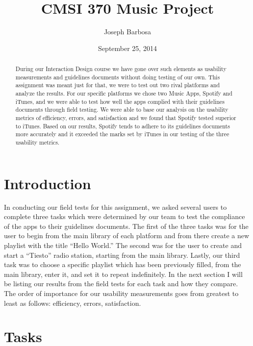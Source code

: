 \documentclass[a4paper]{article}
\title{CMSI 370 Music Project}
\author{Joseph Barbosa}
\date{September 25, 2014}
\begin{document}
\maketitle

\begin{abstract}
During our Interaction Design course we have gone over such elements as usability measurements and guidelines documents without doing testing of our own. This assignment was meant just for that, we were to test out two rival platforms and analyze the results. For our specific platforms we chose two Music Apps, Spotify and iTunes, and we were able to test how well the apps complied with their guidelines documents through field testing.
We were able to base our analysis on the usability metrics of efficiency, errors, and satisfaction and we found that Spotify tested superior to iTunes. Based on our results, Spotify tends to adhere to its guidelines documents more accurately and it exceeded the marks set by iTunes in our testing of the three usability metrics.
\end{abstract}

\section{Introduction}

In conducting our field tests for this assignment, we asked several users to complete three tasks which were determined by our team to test the compliance of the apps to their guidelines documents. The first of the three tasks was for the user to begin from the main library of each platform and from there create a new playlist with the title ``Hello World.'' The second was for the user to create and start a ``Tiesto'' radio station, starting from the main library. Lastly, our third task was to choose a specific playlist which has been previously filled, from the main library, enter it, and set it to repeat indefinitely. In the next section I will be listing our results from the field tests for each task and how they compare. The order of importance for our usability measurements goes from greatest to least as follows: efficiency, errors, satisfaction.



\section{Tasks}
\label{sec:tasks}
\end{document}
